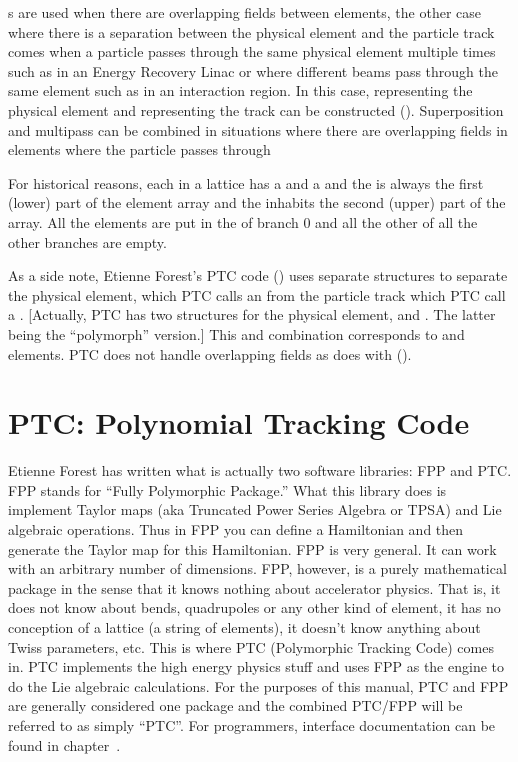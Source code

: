 s are used when there are overlapping fields between
elements, the other case where there is a separation between the
physical element and the particle track comes when a particle passes
through the same physical element multiple times such as in an Energy
Recovery Linac or where different beams pass through the same element
such as in an interaction region. In this case, 
representing the physical element and 
representing the track can be constructed ().
Superposition and multipass can be combined in situations where there
are overlapping fields in elements where the particle passes through

For historical reasons, each  in a lattice has a
 and a  and the  is always the first (lower) part of the element array and the
 inhabits the second (upper) part of the array.  All
the  elements are put in the  of branch 0
and all the other  of all the other branches are
empty.

As a side note, Etienne Forest's PTC code () uses separate
structures to separate the physical element, which PTC calls an
 from the particle track which PTC call a .
[Actually, PTC has two structures for the physical element,
 and . The latter being the ``polymorph''
version.] This  and  combination corresponds to
\bmad {} and  elements. PTC does
not handle overlapping fields as \bmad does with 
().

\section{PTC: Polynomial Tracking Code}
\label{s:ptc.intro}

Etienne Forest\cite{b:forest} has written what is actually two
software libraries: FPP and PTC.  FPP stands for ``Fully Polymorphic
Package.'' What this library does is implement Taylor maps (aka
Truncated Power Series Algebra or TPSA) and Lie algebraic
operations. Thus in FPP you can define a Hamiltonian and then generate
the Taylor map for this Hamiltonian. FPP is very general. It can work
with an arbitrary number of dimensions.  FPP, however, is a purely
mathematical package in the sense that it knows nothing about
accelerator physics. That is, it does not know about bends,
quadrupoles or any other kind of element, it has no conception of a
lattice (a string of elements), it doesn't know anything about Twiss
parameters, etc. This is where PTC (Polymorphic Tracking Code) comes
in. PTC implements the high energy physics stuff and uses FPP as
the engine to do the Lie algebraic calculations.  For the purposes of
this manual, PTC and FPP are generally considered one package and the
combined PTC/FPP will be referred to as simply ``PTC''.
For programmers, interface documentation can be found in
chapter~.

